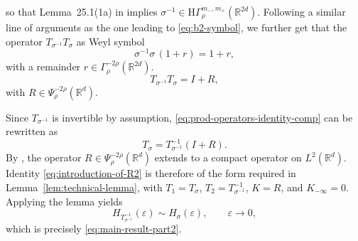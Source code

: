 \documentclass[a4paper,12pt]{article}
\newcommand{\R}{\mathbb{R}}
\newcommand{\symbolnot}{\sigma}
\begin{document}
so that  Lemma~25.1(1a) in
\cite{shubin_pseudodifferential_2001} implies 
$\sigma^{-1}\in \mathrm{H}\Gamma^{m_-,m_+}_\rho(\R^{2d})$.
Following a similar line of arguments as the one leading to \eqref{eq:b2-symbol},
we further get that the operator $T_{\symbolnot^{-1}}T_{\symbolnot }$ as Weyl symbol 
\[
\sigma^{-1}\sigma\,(1+r)=1+r,
\]
with a remainder $r\in\Gamma^{-2\rho}_\rho(\R^{2d})$.
\fi 
\begin{equation}\label{eq:prod-operators-identity-comp}
    T_{\sigma^{-1}}T_\sigma
    =
    I+R,
\end{equation}
with \(R\in\Psi^{-2\rho}_\rho(\R^{d})\).

Since \(T_{\sigma^{-1}}\) is invertible by assumption, \eqref{eq:prod-operators-identity-comp}
can be rewritten as
\begin{equation}\label{eq:introduction-of-R2}
    T_\sigma
    =
    T_{\sigma^{-1}}^{-1}(I+R).
\end{equation}
By \cite[Theorem~24.4]{shubin_pseudodifferential_2001}, the operator
\(R\in\Psi^{-2\rho}_\rho(\R^{d})\) extends to a compact operator on \(L^2(\R^d)\).
Identity \eqref{eq:introduction-of-R2} is therefore of the form required in
Lemma~\ref{lem:technical-lemma}, with
\(T_1=T_\sigma\), \(T_2=T_{\sigma^{-1}}^{-1}\),
\(K=R\), and \(K_{-\infty}=0\).
Applying the lemma yields
\[
    H_{T_{\sigma^{-1}}^{-1}}(\varepsilon)
    \sim
    H_\sigma(\varepsilon),
    \qquad \varepsilon\to0,
\]
which is precisely \eqref{eq:main-result-part2}.
\end{document}

